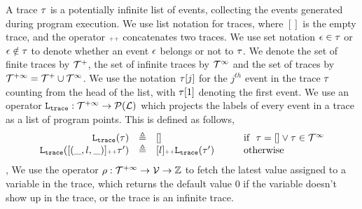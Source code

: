 A trace $\mathtt{\tau}$ is a potentially infinite list of events, 
collecting the events generated  during program execution. 
We use list notation for traces, where $[]$ is the empty trace, and
the operator ${\scriptscriptstyle ++}$ concatenates two traces. We use set notation $\mathtt{\epsilon} \in \mathtt{\tau}$ or $\mathtt{\epsilon} \notin \mathtt{\tau}$ to denote whether an event $\mathtt{\epsilon}$ belongs or not to $\mathtt{\tau}$.
We denote the set of finite traces by $\mathcal{T}^{+}$, the set of infinite traces by $\mathcal{T}^{\infty}$ and the set of traces by $\mathcal{T}^{+\infty} = \mathcal{T}^{+} \cup \mathcal{T}^{\infty}$.
We use the notation $\mathtt{\tau}[j]$ for the $j^{th}$ event in the trace $\mathtt{\tau}$ counting from the head of the list, with $\mathtt{\tau}[1]$ denoting the first event.
We use an operator $\mathtt{L}_{\mathtt{{trace}}}: \mathcal{T}^{+\infty} \to \mathcal{P}{(\mathcal{L})}$ which projects the labels of every event in a trace as a list of program points. This is defined as follows,
\[
\begin{array}{rcll}
\mathtt{L}_{\mathtt{{trace}}}(\mathtt{\tau}) &\triangleq & [] &\qquad  \mbox{if}~~ \mathtt{\tau} = [] \lor \mathtt{\tau} \in \mathcal{T}^{\infty}
\\ 
\mathtt{L}_{\mathtt{{trace}}}([(\_, l, \_)] {\scriptscriptstyle ++} \mathtt{\tau}') &\triangleq & [l] {\scriptscriptstyle ++} \mathtt{L}_{\mathtt{{trace}}}(\mathtt{\tau}') &\qquad  \mbox{otherwise}
\end{array}
\]
%
, 
We use the operator $\rho: {\mathcal{T}^{+\infty}} \to \mathcal{V} \to \mathbb{Z}$ 
 to fetch the latest value assigned to a variable in the trace,
 which returns the default value $0$ if the variable doesn't show up in the trace, or the trace is an infinite trace.
